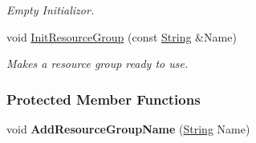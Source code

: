 \begin{DoxyCompactItemize}
\begin{DoxyCompactList}\small\item\em Empty Initializor. \item\end{DoxyCompactList}\item 
void \hyperlink{classMezzanine_1_1ResourceManager_a836ed2ec024abe10433d8e4b18378c2c}{InitResourceGroup} (const \hyperlink{namespaceMezzanine_acf9fcc130e6ebf08e3d8491aebcf1c86}{String} \&Name)
\begin{DoxyCompactList}\small\item\em Makes a resource group ready to use. \item\end{DoxyCompactList}\end{DoxyCompactItemize}
\subsubsection*{Protected Member Functions}
\begin{DoxyCompactItemize}
\item 
\hypertarget{classMezzanine_1_1ResourceManager_ab5d5f9eeaf17337556bc833d8befae19}{
void {\bfseries AddResourceGroupName} (\hyperlink{namespaceMezzanine_acf9fcc130e6ebf08e3d8491aebcf1c86}{String} Name)}
\label{classMezzanine_1_1ResourceManager_ab5d5f9eeaf17337556bc833d8befae19}

\end{DoxyCompactItemize}
